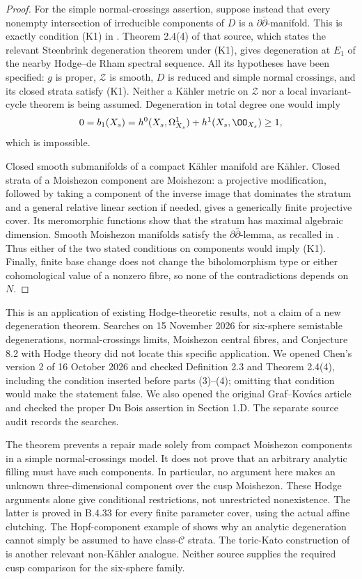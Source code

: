 \begin{proof}
For the simple normal-crossings assertion, suppose instead that
every nonempty intersection of irreducible components of $D$
is a $\partial\bar\partial$-manifold. This is exactly condition
(K1) in \citet[Definition 2.3]{Chen2026HodgeRoot}.
Theorem 2.4(4) of that source, which states the relevant
Steenbrink degeneration theorem under (K1), gives degeneration
at $E_1$ of the nearby Hodge--de Rham spectral sequence.
All its hypotheses have been specified: $g$ is proper,
$\mathcal Z$ is smooth, $D$ is reduced and simple normal
crossings, and its closed strata satisfy (K1). Neither a
K\"ahler metric on $\mathcal Z$ nor a local invariant-cycle
theorem is being assumed. Degeneration in total degree one
would imply
\[
 0=b_1(X_s)=h^0(X_s,\Omega^1_{X_s})+h^1(X_s,\OO_{X_s})
          \geq1,
\]
which is impossible.

Closed smooth submanifolds of a compact K\"ahler manifold are
K\"ahler. Closed strata of a Moishezon component are Moishezon:
a projective modification, followed by taking a component of
the inverse image that dominates the stratum and a general
relative linear section if needed, gives a generically finite
projective cover. Its meromorphic functions show that the
stratum has maximal algebraic dimension. Smooth Moishezon
manifolds satisfy the $\partial\bar\partial$-lemma, as recalled
in \citet[Section 2.1, p.8]{Chen2026HodgeRoot}. Thus either
of the two stated conditions on components would imply (K1).
Finally, finite base change does not change the biholomorphism
type or either cohomological value of a nonzero fibre, so none
of the contradictions depends on $N$.
\end{proof}

This is an application of existing Hodge-theoretic results, not
a claim of a new degeneration theorem. Searches on 15 November
2026 for six-sphere semistable degenerations, normal-crossings
limits, Moishezon central fibres, and Conjecture 8.2 with Hodge
theory did not locate this specific application. We opened
Chen's version 2 of 16 October 2026 and checked Definition 2.3
and Theorem 2.4(4), including the condition inserted before
parts (3)--(4); omitting that condition would make the
statement false. We also opened the original Graf--Kov\'acs
article and checked the proper Du Bois assertion in Section
1.D. The separate source audit records the searches.

The theorem prevents a repair made solely from compact
Moishezon components in a simple normal-crossings model.
It does not prove that an arbitrary analytic filling must have
such components. In particular, no argument here makes an
unknown three-dimensional component over the cusp Moishezon.
These Hodge arguments alone give conditional restrictions, not
unrestricted nonexistence. The latter is proved in B.4.33 for
every finite parameter cover, using the actual affine clutching.
The Hopf-component example of
\citet[Theorem 1.4 and Example 2.1]{Nishiguchi1988IIRoot}
shows why an analytic degeneration cannot simply be assumed to
have class-$\mathcal C$ strata. The toric-Kato construction of
\citet[Theorem 7.1]{IstratiEtAl2022Root} is another relevant
non-K\"ahler analogue. Neither source supplies the required
cusp comparison for the six-sphere family.

